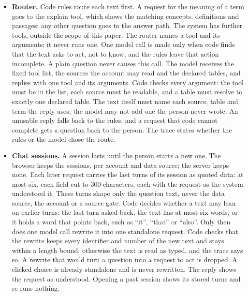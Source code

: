 \documentclass[11pt,a4paper]{article}
\begin{document}
\begin{itemize}[nosep]
\item \textbf{Router.} Code rules route each text first. A request for the meaning of a term goes to the explain tool, which shows the matching concepts, definitions and passages; any other question goes to the answer path. The system has further tools, outside the scope of this paper. The router names a tool and its arguments; it never runs one. One model call is made only when code finds that the text asks to act, not to know, and the rules leave that action incomplete. A plain question never causes this call. The model receives the fixed tool list, the sources the account may read and the declared tables, and replies with one tool and its arguments. Code checks every argument: the tool must be in the list, each source must be readable, and a table must resolve to exactly one declared table. The text itself must name each source, table and term the reply uses; the model may not add one the person never wrote. An unusable reply falls back to the rules, and a request that code cannot complete gets a question back to the person. The trace states whether the rules or the model chose the route. %
\item \textbf{Chat sessions.} A session lasts until the person starts a new one. The browser keeps the sessions, per account and data source; the server keeps none. Each later request carries the last turns of its session as quoted data: at most six, each field cut to 300 characters, each with the request as the system understood it. These turns shape only the question text, never the data source, the account or a source gate. Code decides whether a text may lean on earlier turns: the last turn asked back, the text has at most six words, or it holds a word that points back, such as ``it'', ``that'' or ``also''. Only then does one model call rewrite it into one standalone request. Code checks that the rewrite keeps every identifier and number of the new text and stays within a length bound; otherwise the text is read as typed, and the trace says so. A rewrite that would turn a question into a request to act is dropped. A clicked choice is already standalone and is never rewritten. The reply shows the request as understood. Opening a past session shows its stored turns and re-runs nothing. %

\end{itemize}
\end{document}
